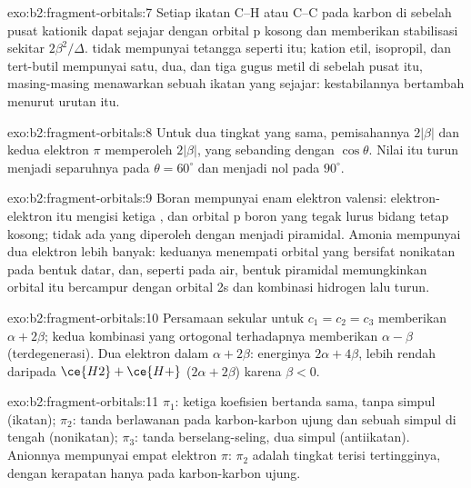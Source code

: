 \begin{solution}{exo:b2:fragment-orbitals:7}
Setiap ikatan C--H atau C--C pada karbon di sebelah pusat kationik dapat
sejajar dengan orbital p kosong dan memberikan stabilisasi sekitar
$2\beta^2/\Delta$.  tidak mempunyai tetangga seperti itu; kation
etil, isopropil, dan tert-butil mempunyai satu, dua, dan tiga gugus metil
di sebelah pusat itu, masing-masing menawarkan sebuah ikatan yang sejajar:
kestabilannya bertambah menurut urutan itu.
\end{solution}

\begin{solution}{exo:b2:fragment-orbitals:8}
Untuk dua tingkat yang sama, pemisahannya $2|\beta|$ dan kedua elektron
$\pi$ memperoleh $2|\beta|$, yang sebanding dengan $\cos\theta$. Nilai itu
turun menjadi separuhnya pada $\theta = 60^\circ$ dan menjadi nol pada
$90^\circ$.
\end{solution}

\begin{solution}{exo:b2:fragment-orbitals:9}
Boran mempunyai enam elektron valensi: elektron-elektron itu mengisi
ketiga , dan orbital p boron yang tegak lurus bidang tetap
kosong; tidak ada yang diperoleh dengan menjadi piramidal. Amonia
mempunyai dua elektron lebih banyak: keduanya menempati orbital yang
bersifat nonikatan pada bentuk datar, dan, seperti pada air, bentuk
piramidal memungkinkan orbital itu bercampur dengan orbital 2s dan
kombinasi hidrogen lalu turun.
\end{solution}

\begin{solution}{exo:b2:fragment-orbitals:10}
Persamaan sekular untuk $c_1 = c_2 = c_3$ memberikan $\alpha + 2\beta$; kedua
kombinasi yang ortogonal terhadapnya memberikan $\alpha - \beta$
(terdegenerasi). Dua elektron dalam $\alpha + 2\beta$: energinya
$2\alpha + 4\beta$, lebih rendah daripada $\ce{H2} + \ce{H+}$
($2\alpha + 2\beta$) karena $\beta < 0$.
\end{solution}

\begin{solution}{exo:b2:fragment-orbitals:11}
$\pi_1$: ketiga koefisien bertanda sama, tanpa simpul (ikatan); $\pi_2$:
tanda berlawanan pada karbon-karbon ujung dan sebuah simpul di tengah
(nonikatan); $\pi_3$: tanda berselang-seling, dua simpul (antiikatan).
Anionnya mempunyai empat elektron $\pi$: $\pi_2$ adalah tingkat terisi
tertingginya, dengan kerapatan hanya pada karbon-karbon ujung.
\end{solution}

